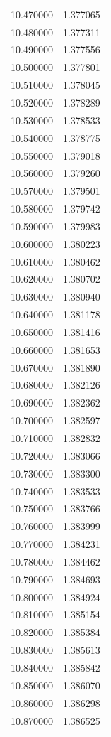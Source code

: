 \begin{tabular}{rr}
10.470000 & 1.377065 \\
10.480000 & 1.377311 \\
10.490000 & 1.377556 \\
10.500000 & 1.377801 \\
10.510000 & 1.378045 \\
10.520000 & 1.378289 \\
10.530000 & 1.378533 \\
10.540000 & 1.378775 \\
10.550000 & 1.379018 \\
10.560000 & 1.379260 \\
10.570000 & 1.379501 \\
10.580000 & 1.379742 \\
10.590000 & 1.379983 \\
10.600000 & 1.380223 \\
10.610000 & 1.380462 \\
10.620000 & 1.380702 \\
10.630000 & 1.380940 \\
10.640000 & 1.381178 \\
10.650000 & 1.381416 \\
10.660000 & 1.381653 \\
10.670000 & 1.381890 \\
10.680000 & 1.382126 \\
10.690000 & 1.382362 \\
10.700000 & 1.382597 \\
10.710000 & 1.382832 \\
10.720000 & 1.383066 \\
10.730000 & 1.383300 \\
10.740000 & 1.383533 \\
10.750000 & 1.383766 \\
10.760000 & 1.383999 \\
10.770000 & 1.384231 \\
10.780000 & 1.384462 \\
10.790000 & 1.384693 \\
10.800000 & 1.384924 \\
10.810000 & 1.385154 \\
10.820000 & 1.385384 \\
10.830000 & 1.385613 \\
10.840000 & 1.385842 \\
10.850000 & 1.386070 \\
10.860000 & 1.386298 \\
10.870000 & 1.386525 \\

\end{tabular}
